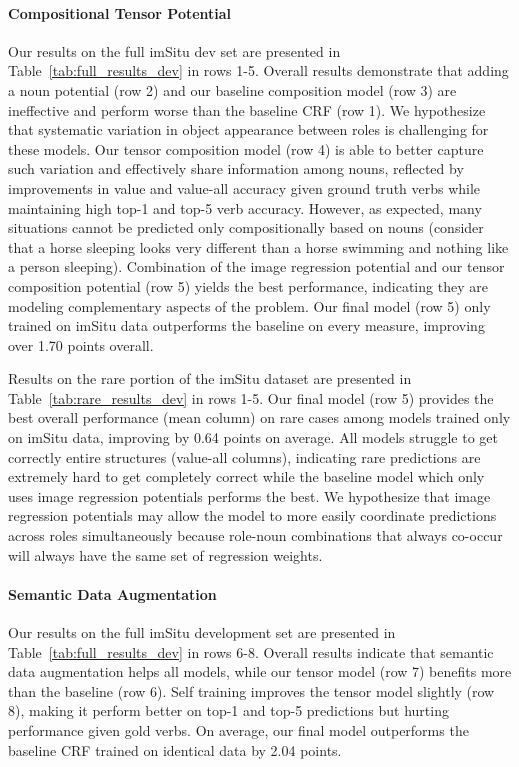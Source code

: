 \documentclass[10pt,twocolumn,letterpaper]{article}
\begin{document}
\paragraph{Compositional Tensor Potential}
Our results on the full imSitu dev set are presented in Table~\ref{tab:full_results_dev} in rows 1-5.   
Overall results demonstrate that adding a noun potential (row 2) and our baseline composition model (row 3) are ineffective and perform worse than the baseline CRF (row 1).
We hypothesize that systematic variation in object appearance between roles is challenging for these models. 
Our tensor composition model (row 4) is able to better capture such variation and effectively share information among nouns, reflected by improvements in value and value-all accuracy given ground truth verbs while maintaining high top-1 and top-5 verb accuracy.
However, as expected, many situations cannot be predicted only compositionally based on nouns (consider that a horse sleeping looks very different than a horse swimming and nothing like a person sleeping).
Combination of the image regression potential and our tensor composition potential (row 5) yields the best performance, indicating they are modeling complementary aspects of the problem.
Our final model (row 5) only trained on imSitu data outperforms the baseline on every measure, improving over 1.70 points overall. 

Results on the rare portion of the imSitu dataset are presented in Table~\ref{tab:rare_results_dev} in rows 1-5.
Our final model (row 5) provides the best overall performance (mean column) on rare cases among models trained only on imSitu data, improving by 0.64 points on average.
All models struggle to get correctly entire structures (value-all columns), indicating rare predictions are extremely hard to get completely correct while the baseline model which only uses image regression potentials performs the best. 
We hypothesize that image regression potentials may allow the model to more easily coordinate predictions across roles simultaneously because role-noun combinations that always co-occur will always have the same set of regression weights.




\paragraph{Semantic Data Augmentation}
Our results on the full imSitu development set are presented in Table~\ref{tab:full_results_dev} in rows 6-8. 
Overall results indicate that semantic data augmentation helps all models, while our tensor model (row 7) benefits more than the baseline (row 6).
Self training improves the tensor model slightly (row 8), making it perform better on top-1 and top-5 predictions but hurting performance given gold verbs.
On average, our final model outperforms the baseline CRF trained on identical data by 2.04 points. 
\end{document}
